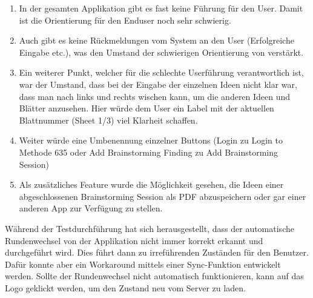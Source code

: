 \begin{enumerate}
	\item In der gesamten Applikation gibt es fast keine Führung für den User. Damit ist die Orientierung für den Enduser noch sehr schwierig. 
	\item Auch gibt es keine Rückmeldungen vom System an den User (Erfolgreiche Eingabe etc.), was den Umstand der schwierigen Orientierung von verstärkt.
	\item Ein weiterer Punkt, welcher für die schlechte Userführung verantwortlich ist, war der Umstand, dass  bei der Eingabe der einzelnen Ideen nicht klar war, dass man nach links und rechts wischen kann, um die anderen Ideen und Blätter anzusehen. Hier würde dem User ein Label mit der aktuellen Blattnummer (Sheet 1/3) viel Klarheit schaffen.
	\item Weiter würde eine Umbenennung einzelner Buttons (\grqq Login\grqq{} zu \grqq Login to Methode 635\grqq{} oder \grqq Add Brainstorming Finding\grqq{} zu \grqq Add Brainstorming Session\grqq{})
	\item Als zusätzliches Feature wurde die Möglichkeit gesehen, die Ideen einer abgeschlossenen Brainstorming Session als PDF abzuspeichern oder gar einer anderen App zur Verfügung zu stellen.
\end{enumerate}
Während der Testdurchführung hat sich herausgestellt, dass der automatische Rundenwechsel von der Applikation nicht immer korrekt erkannt und durchgeführt wird. Dies führt dann zu irreführenden Zuständen für den Benutzer. Dafür konnte aber ein Workaround mittels einer Sync-Funktion entwickelt werden. Sollte der Rundenwechsel nicht automatisch funktionieren, kann auf das Logo geklickt werden, um den Zustand neu vom Server zu laden.




